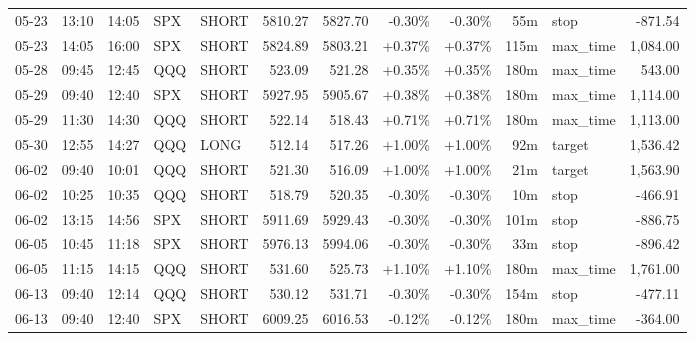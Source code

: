 \documentclass[11pt,a4paper,twoside]{article}
\begin{document}
\begin{center}
\begin{longtable}{>{\color{txtmain}}l l l l l r r r r r >{\color{txtmain}}l r}
05-23 & 13:10 & 14:05 & SPX & SHORT & 5810.27 & 5827.70 & \textcolor{lossred}{-0.30\%} & \textcolor{lossred}{-0.30\%} & 55m & stop & \textcolor{lossred}{-871.54} \\
05-23 & 14:05 & 16:00 & SPX & SHORT & 5824.89 & 5803.21 & \textcolor{wingreen}{+0.37\%} & \textcolor{wingreen}{+0.37\%} & 115m & max\_time & \textcolor{wingreen}{1,084.00} \\
05-28 & 09:45 & 12:45 & QQQ & SHORT & 523.09 & 521.28 & \textcolor{wingreen}{+0.35\%} & \textcolor{wingreen}{+0.35\%} & 180m & max\_time & \textcolor{wingreen}{543.00} \\
05-29 & 09:40 & 12:40 & SPX & SHORT & 5927.95 & 5905.67 & \textcolor{wingreen}{+0.38\%} & \textcolor{wingreen}{+0.38\%} & 180m & max\_time & \textcolor{wingreen}{1,114.00} \\
05-29 & 11:30 & 14:30 & QQQ & SHORT & 522.14 & 518.43 & \textcolor{wingreen}{+0.71\%} & \textcolor{wingreen}{+0.71\%} & 180m & max\_time & \textcolor{wingreen}{1,113.00} \\
05-30 & 12:55 & 14:27 & QQQ & LONG & 512.14 & 517.26 & \textcolor{wingreen}{+1.00\%} & \textcolor{wingreen}{+1.00\%} & 92m & target & \textcolor{wingreen}{1,536.42} \\
06-02 & 09:40 & 10:01 & QQQ & SHORT & 521.30 & 516.09 & \textcolor{wingreen}{+1.00\%} & \textcolor{wingreen}{+1.00\%} & 21m & target & \textcolor{wingreen}{1,563.90} \\
06-02 & 10:25 & 10:35 & QQQ & SHORT & 518.79 & 520.35 & \textcolor{lossred}{-0.30\%} & \textcolor{lossred}{-0.30\%} & 10m & stop & \textcolor{lossred}{-466.91} \\
06-02 & 13:15 & 14:56 & SPX & SHORT & 5911.69 & 5929.43 & \textcolor{lossred}{-0.30\%} & \textcolor{lossred}{-0.30\%} & 101m & stop & \textcolor{lossred}{-886.75} \\
06-05 & 10:45 & 11:18 & SPX & SHORT & 5976.13 & 5994.06 & \textcolor{lossred}{-0.30\%} & \textcolor{lossred}{-0.30\%} & 33m & stop & \textcolor{lossred}{-896.42} \\
06-05 & 11:15 & 14:15 & QQQ & SHORT & 531.60 & 525.73 & \textcolor{wingreen}{+1.10\%} & \textcolor{wingreen}{+1.10\%} & 180m & max\_time & \textcolor{wingreen}{1,761.00} \\
06-13 & 09:40 & 12:14 & QQQ & SHORT & 530.12 & 531.71 & \textcolor{lossred}{-0.30\%} & \textcolor{lossred}{-0.30\%} & 154m & stop & \textcolor{lossred}{-477.11} \\
06-13 & 09:40 & 12:40 & SPX & SHORT & 6009.25 & 6016.53 & \textcolor{lossred}{-0.12\%} & \textcolor{lossred}{-0.12\%} & 180m & max\_time & \textcolor{lossred}{-364.00} \\

\end{longtable}
\end{center}
\end{document}
